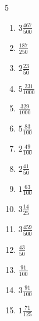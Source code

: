 \documentclass[12pt]{article}
\begin{document}
\begin{multicols}{5}
\begin{enumerate}
\item $ 3 \frac{467}{500} $
\item $ \frac{187}{250} $
\item $ 2 \frac{23}{50} $
\item $ 5 \frac{231}{1000} $
\item $ \frac{329}{1000} $
\item $ 5 \frac{83}{100} $
\item $ 2 \frac{49}{100} $
\item $ 2 \frac{41}{50} $
\item $ 1 \frac{63}{100} $
\item $ 3 \frac{14}{25} $
\item $ 3 \frac{459}{500} $
\item $ \frac{43}{50} $
\item $ \frac{91}{100} $
\item $ 3 \frac{91}{100} $
\item $ 1 \frac{71}{125} $
\end{enumerate}\end{multicols}\newpage
\end{document}
